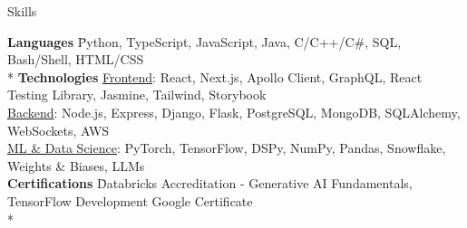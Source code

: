 \documentclass{article}
\newlength{\tabin}
\newlength{\secsep}
\newcommand{\lineunder}{\vspace*{-8pt} \\ \hspace*{-6pt} \hrulefill \\ \vspace*{-15pt}}
\newenvironment{tabbedsection}[1]{
  \begin{list}{}{
      \setlength{\itemsep}{0pt}
      \setlength{\labelsep}{0pt}
      \setlength{\labelwidth}{0pt}
      \setlength{\leftmargin}{\tabin}
      \setlength{\rightmargin}{\tabin}
      \setlength{\listparindent}{0pt}
      \setlength{\parsep}{0pt}
      \setlength{\parskip}{0pt}
      \setlength{\partopsep}{0pt}
      \setlength{\topsep}{#1}
    }
  \item[]
}{\end{list}}
\newenvironment{nospacetabbing}{
    \begin{tabbing}
}{\end{tabbing}\vspace{-1.2em}}
\newenvironment{resume_section}[1]{
  \filbreak
  \vspace{2\secsep}
  \textsc{\large#1}
  \lineunder
  \begin{tabbedsection}{\secsep}
}{\end{tabbedsection}}
\begin{document}
\begin{resume_section}{Skills}
  \begin{nospacetabbing}
  \textbf{Languages}  \= Python, TypeScript, JavaScript, Java, C/C++/C\#, SQL, Bash/Shell, HTML/CSS\\*
\textbf{Technologies} \= \underline{Frontend}: React, Next.js, Apollo Client, GraphQL, React Testing Library, Jasmine, Tailwind, Storybook \\
\> \underline{Backend}: Node.js, Express, Django, Flask, PostgreSQL, MongoDB, SQLAlchemy, WebSockets, AWS \\ 
\> \underline{ML \& Data Science}: PyTorch, TensorFlow, DSPy, NumPy, Pandas, Snowflake, Weights \& Biases, LLMs \\
  \textbf{Certifications} \= Databricks Accreditation - Generative AI Fundamentals, TensorFlow Development Google Certificate \\*
  \end{nospacetabbing}

\end{resume_section}
\end{document}
